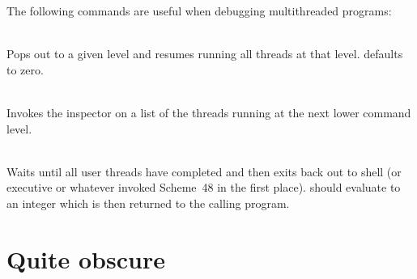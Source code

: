 The following commands are useful when debugging multithreaded programs:
\begin{description}
\item {}\\
  Pops out to a given level and resumes running all threads at that level.
   defaults to zero.

\item {}\\
    Invokes the inspector on a list of the threads running at the
    next lower command level.

\item {}\\
    Waits until all user threads have completed and then
    exits back out to shell (or executive or whatever invoked Scheme~48
    in the first place).
     should evaluate to an integer which is then
    returned to the calling program.

%
%

\end{description}

\section{Quite obscure}

